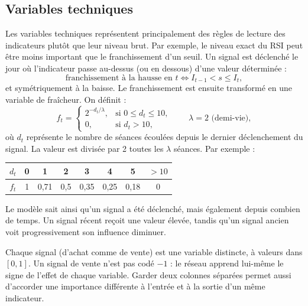\documentclass[11pt,a4paper]{article}
\renewcommand{\_}{\usorig\allowbreak}   %
\begin{document}
\subsection{Variables techniques}\label{sec:signaux}
Les variables techniques représentent principalement des règles de lecture des
indicateurs plutôt que leur niveau brut. Par exemple, le niveau exact du RSI peut être
moins important que le franchissement d'un seuil. Un signal est déclenché le jour où
l'indicateur passe au-dessus (ou en dessous) d'une valeur déterminée :
\[
  \text{franchissement à la hausse en } t \iff I_{t-1} < s \le I_t ,
\]
et symétriquement à la baisse. Le franchissement est ensuite transformé en une variable
de fraîcheur. On définit :
\[
  f_t = \begin{cases} 2^{-d_t/\lambda}, & \text{si } 0 \le d_t \le 10,\\ 0, & \text{si } d_t > 10, \end{cases}
  \qquad \lambda = 2 \text{ (demi-vie)},
\]
où $d_t$ représente le nombre de séances écoulées depuis le dernier déclenchement du
signal. La valeur est divisée par 2 toutes les $\lambda$ séances. Par exemple :
\begin{center}
\begin{tabular}{c|ccccccc}
$d_t$ & 0 & 1 & 2 & 3 & 4 & 5 & $>10$ \\ \hline
$f_t$ & 1 & 0{,}71 & 0{,}5 & 0{,}35 & 0{,}25 & 0{,}18 & 0
\end{tabular}
\end{center}
Le modèle sait ainsi qu'un signal a été déclenché, mais également depuis combien de temps.
Un signal récent reçoit une valeur élevée, tandis qu'un signal ancien voit
progressivement son influence diminuer.

Chaque signal (d'achat comme de vente) est une variable distincte, à valeurs dans $[0,1]$.
Un signal de vente n'est pas codé $-1$ : le réseau apprend lui-même le signe de l'effet de
chaque variable. Garder deux colonnes séparées permet aussi d'accorder une importance
différente à l'entrée et à la sortie d'un même indicateur.
\end{document}
